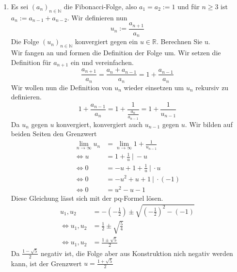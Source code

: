 \documentclass{article}
\begin{document}
\begin{enumerate}[ label= (\roman*) ]
        \item Es sei \( {(a_n)}_{n \in \mathbb{N} } \) die Fibonacci-Folge, also \( a_1 = a_2 := 1 \) und für \( n \geq 3 \) ist \(a_n := a_{n-1} + a_{n-2} \).
        Wir definieren nun
        \[ u_n := \frac{ a_{n+1} }{ a_n } \]
        Die Folge \( {(u_n)}_{ n \in \mathbb{N} } \) konvergiert gegen ein \( u \in \mathbb{R} \). Berechnen Sie u. \\
        Wir fangen an und formen die Definition der Folge um. Wir setzen die Definition für \(a_{n+1}\) ein und vereinfachen.
        \[ \frac{ a_{n+1} }{ a_n } = \frac{ a_n + a_{n-1} }{ a_n } = 1 + \frac{ a_{n-1} }{ a_n } \]
        Wir wollen nun die Definition von \(u_n\) wieder einsetzen um \(u_n\) rekursiv zu definieren.
        \[1 + \frac{ a_{n-1} }{ a_n } = 1 + \frac{1}{ \frac{ a_n }{ a_{n-1} } } = 1 + \frac{1}{ u_{n-1} } \]
        Da \(u_n\) gegen \(u\) konvergiert, konvergiert auch \(u_{n-1}\) gegen \(u\). Wir bilden auf beiden Seiten den Grenzwert
        \begin{align*}
            \lim_{n \to \infty} u_n &= \lim_{n \to \infty} 1 + \frac{1}{u_{n-1}} \\
            \Leftrightarrow u &= 1 + \frac{1}{u} \: | \: -u \\
            \Leftrightarrow 0 &= -u + 1 + \frac{1}{u} \: | \: \cdot u \\
            \Leftrightarrow 0 &= -u^2 + u + 1 \: | \: \cdot (-1) \\
            \Leftrightarrow 0 &= u^2 - u - 1
        \end{align*}
        Diese Gleichung lässt sich mit der pq-Formel lösen.
        \begin{align*}
             u_1, u_2 &= - \left( -\frac{1}{2} \right) \pm \sqrt{ {\left( -\frac{1}{2} \right)}^2 - (-1) } \\
             \Leftrightarrow u_1, u_2 &= \frac{1}{2} \pm \sqrt{ \frac{5}{4} } \\
             \Leftrightarrow u_1, u_2 &= \frac{ 1 \pm \sqrt{5} }{2} 
        \end{align*}
        Da \( \frac{ 1 - \sqrt{5} }{2} \) negativ ist, die Folge aber aus Konstruktion nich negativ werden kann,
        ist der Grenzwert \( u = \frac{ 1 + \sqrt{5} }{2} \)

    \end{enumerate}
    
\end{document}
